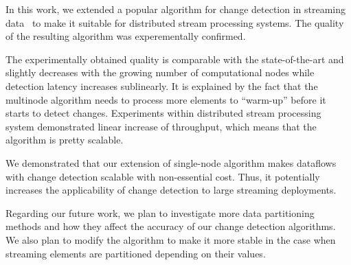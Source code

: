 \label {fs-lightbulbs-conclusion}

In this work, we extended a popular algorithm for change detection in streaming data~\cite{kifer2004detecting} to make it suitable for distributed stream processing systems. The quality of the resulting algorithm was experementally confirmed.

The experimentally obtained quality is comparable with the state-of-the-art and slightly decreases with the growing number of computational nodes while detection latency increases sublinearly. It is explained by the fact that the multinode algorithm needs to process more elements to ``warm-up'' before it starts to detect changes. Experiments within distributed stream processing system demonstrated linear increase of throughput, which means that the algorithm is pretty scalable.

We demonstrated that our extension of single-node algorithm makes dataflows with change detection scalable with non-essential cost. Thus, it potentially increases the applicability of change detection to large streaming deployments.

Regarding our future work, we plan to investigate more data partitioning methods and how they affect the accuracy of our change detection algorithms. We also plan to modify the algorithm to make it more stable in the case when streaming elements are partitioned depending on their values.